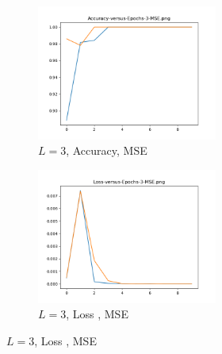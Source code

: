 \begin{figure}[!htbp]
\begin{subfigure}
\centering
\includegraphics[angle=0,width=0.65\textwidth]{assign-3/logs/Accuracy-3-MSE-hidden-5.png}
\caption{$L=3$, Accuracy, MSE}
\end{subfigure}
\begin{subfigure}
\centering
\includegraphics[angle=0,width=0.65\textwidth]{assign-3/logs/Loss-3-MSE-hidden-5.png}
\caption{$L=3$, Loss , MSE}
\end{subfigure}
\end{figure}

